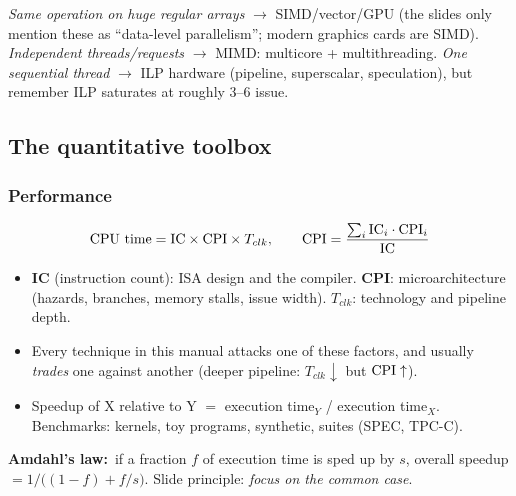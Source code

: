 \begin{dec}
\emph{Same operation on huge regular arrays} $\rightarrow$ SIMD/vector/GPU (the slides only mention these as ``data-level parallelism''; modern graphics cards are SIMD). \emph{Independent threads/requests} $\rightarrow$ MIMD: multicore + multithreading. \emph{One sequential thread} $\rightarrow$ ILP hardware (pipeline, superscalar, speculation), but remember ILP saturates at roughly 3--6 issue.
\end{dec}


\subsection{The quantitative toolbox}
\subsubsection{Performance}
\[
\text{CPU time}=\text{IC}\times\mathrm{CPI}\times T_{clk},\qquad
\mathrm{CPI}=\frac{\sum_i \text{IC}_i\cdot\mathrm{CPI}_i}{\text{IC}}
\]
\begin{itemize}
\item \textbf{IC} (instruction count): ISA design and the compiler. \textbf{CPI}: microarchitecture (hazards, branches, memory stalls, issue width). \textbf{$T_{clk}$}: technology and pipeline depth.
\item Every technique in this manual attacks one of these factors, and usually \emph{trades} one against another (deeper pipeline: $T_{clk}\downarrow$ but $\mathrm{CPI}\uparrow$).
\item Speedup of X relative to Y $=$ execution time$_Y$ / execution time$_X$. Benchmarks: kernels, toy programs, synthetic, suites (SPEC, TPC-C).
\end{itemize}
\textbf{Amdahl's law:}\bs\ if a fraction $f$ of execution time is sped up by $s$, overall speedup $=1/\big((1-f)+f/s\big)$. Slide principle: \emph{focus on the common case}.

